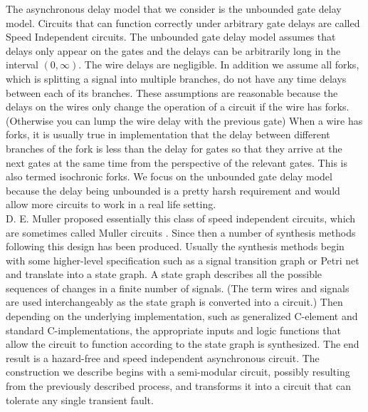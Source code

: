 \documentclass[12pt]{report}
\begin{document}
The asynchronous delay model that we consider is the unbounded gate delay model.  Circuits that can function correctly under arbitrary gate delays are called Speed Independent circuits. The unbounded gate delay model assumes that delays only appear on the gates and the delays can be arbitrarily long in the interval $(0,\infty)$.  The wire delays are negligible.  In addition we assume all forks, which is splitting a signal into multiple branches, do not have any time delays between each of its branches.  These assumptions are reasonable because the delays on the wires only change the operation of a circuit if the wire has forks.  (Otherwise you can lump the wire delay with the previous gate)  When a wire has forks, it is usually true in implementation that the delay between different branches of the fork is less than the delay for gates so that they arrive at the next gates at the same time from the perspective of the relevant gates.  This is also termed isochronic forks.  We focus on the unbounded gate delay model because the delay being unbounded is a pretty harsh requirement and would allow more circuits to work in a real life setting. \\ %

D. E. Muller proposed essentially this class of speed independent circuits, which are sometimes called Muller circuits \cite{Muller_59}.  Since then a number of synthesis methods following this design has been produced.  Usually the synthesis methods begin with some higher-level specification such as a signal transition graph or Petri net and translate into a state graph.  A state graph describes all the possible sequences of changes in a finite number of signals.  (The term wires and signals are used interchangeably as the state graph is converted into a circuit.)  Then depending on the underlying implementation, such as generalized C-element and standard C-implementations, the appropriate inputs and logic functions that allow the circuit to function according to the state graph is synthesized.  The end result is a hazard-free and speed independent asynchronous circuit.  The construction we describe begins with a semi-modular circuit, possibly resulting from the previously described process, and transforms it into a circuit that can tolerate any single transient fault.
     
\end{document}
